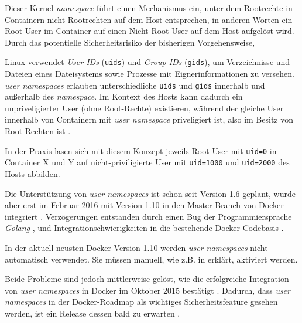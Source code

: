 \documentclass[../main.tex]{subfiles}
\begin{document}
			Dieser Kernel-\emph{namespace} führt einen Mechanismus ein, unter dem Rootrechte in Containern nicht Rootrechten auf dem Host entsprechen, in anderen Worten ein Root-User im Container auf einen Nicht-Root-User auf dem Host aufgelöst wird. Durch das potentielle Sicherheitsrisiko der bisherigen Vorgehensweise,

			Linux verwendet \emph{User IDs} (\texttt{uids}) und \emph{Group IDs} (\texttt{gids}), um Verzeichnisse und Dateien eines Dateisystems sowie Prozesse mit Eignerinformationen zu versehen. \emph{user namespaces} erlauben unterschiedliche \texttt{uids} und \texttt{gids} innerhalb und außerhalb des \emph{namespace}. Im Kontext des Hosts kann dadurch ein unpriveligierter User (ohne Root-Rechte) existieren, während der gleiche User innerhalb von Containern mit \emph{user namespace} priveligiert ist, also im Besitz von Root-Rechten ist \cite{nsUser}.

			In der Praxis lasen sich mit diesem Konzept jeweils Root-User mit \texttt{uid=0} in Container X und Y auf nicht-priviligierte User mit \texttt{uid=1000} und \texttt{uid=2000} des Hosts abbilden.


			Die Unterstützung von \emph{user namespaces} ist schon seit Version 1.6 geplant, wurde aber erst im Februar 2016 mit Version 1.10 in den Master-Branch von Docker integriert \cite{githubDockerChangelog}\cite{githubUserNamespaceProposal}. Verzögerungen entstanden durch einen Bug der Programmiersprache \emph{Golang} \cite{nsUserGolangBug}, und Integrationschwierigkeiten in die bestehende Docker-Codebasis \cite{githubUserNamespaceConflict}.

			In der aktuell neusten Docker-Version 1.10 werden \emph{user namespaces} nicht automatisch verwendet. Sie müssen manuell, wie z.B. in \cite{nsUserEnable} erklärt, aktiviert werden.


			Beide Probleme sind jedoch mittlerweise gelöst, wie die erfolgreiche Integration von \emph{user namespaces} in Docker im Oktober 2015 bestätigt \cite{githubUserNamespaceIntegration}. Dadurch, dass \emph{user namespaces} in der Docker-Roadmap als wichtiges Sicherheitsfeature gesehen werden, ist ein Release dessen bald zu erwarten \cite{githubDockerRoadmap}.

\end{document}
